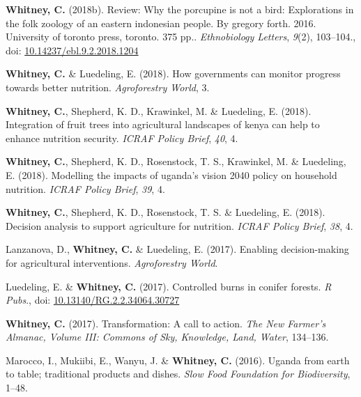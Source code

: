 \documentclass[11pt,a4paper,]{awesome-cv}
\newlength{\cslhangindent}
\newenvironment{CSLReferences}[2] %
 {\begin{list}{}{%
  \setlength{\itemindent}{0pt}
  \setlength{\leftmargin}{0pt}
  \setlength{\parsep}{0pt}
  \ifodd #1
   \setlength{\leftmargin}{\cslhangindent}
   \setlength{\itemindent}{-1\cslhangindent}
  \fi
  \setlength{\itemsep}{#2\baselineskip}}}
 {\end{list}}
\begin{document}
\begin{CSLReferences}{1}{0}
\textbf{Whitney, C.} (2018b). Review: Why the porcupine is not a bird:
Explorations in the folk zoology of an eastern indonesian people. By
gregory forth. 2016. University of toronto press, toronto. 375 pp..
\emph{Ethnobiology Letters}, \emph{9}(2), 103--104., doi:
\href{https://doi.org/10.14237/ebl.9.2.2018.1204}{10.14237/ebl.9.2.2018.1204}

\textbf{Whitney, C.} \& Luedeling, E. (2018). How governments can
monitor progress towards better nutrition. \emph{Agroforestry World}, 3.

\textbf{Whitney, C.}, Shepherd, K. D., Krawinkel, M. \& Luedeling, E.
(2018). Integration of fruit trees into agricultural landscapes of kenya
can help to enhance nutrition security. \emph{ICRAF Policy Brief},
\emph{40}, 4.

\textbf{Whitney, C.}, Shepherd, K. D., Rosenstock, T. S., Krawinkel, M.
\& Luedeling, E. (2018). Modelling the impacts of uganda's vision 2040
policy on household nutrition. \emph{ICRAF Policy Brief}, \emph{39}, 4.

\textbf{Whitney, C.}, Shepherd, K. D., Rosenstock, T. S. \& Luedeling,
E. (2018). Decision analysis to support agriculture for nutrition.
\emph{ICRAF Policy Brief}, \emph{38}, 4.

Lanzanova, D., \textbf{Whitney, C.} \& Luedeling, E. (2017). Enabling
decision-making for agricultural interventions. \emph{Agroforestry
World}.

Luedeling, E. \& \textbf{Whitney, C.} (2017). Controlled burns in
conifer forests. \emph{R Pubs}., doi:
\href{https://doi.org/10.13140/RG.2.2.34064.30727}{10.13140/RG.2.2.34064.30727}

\textbf{Whitney, C.} (2017). Transformation: A call to action. \emph{The
New Farmer's Almanac, Volume III: Commons of Sky, Knowledge, Land,
Water}, 134--136.

Marocco, I., Mukiibi, E., Wanyu, J. \& \textbf{Whitney, C.} (2016).
Uganda from earth to table; traditional products and dishes. \emph{Slow
Food Foundation for Biodiversity}, 1--48.


\end{CSLReferences}
\end{document}
